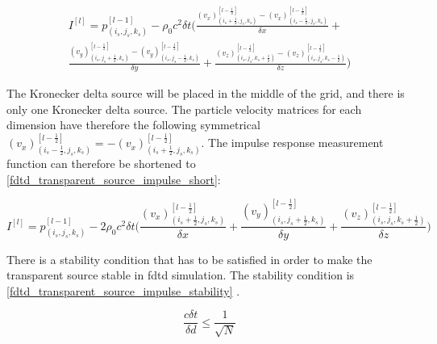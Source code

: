 \begin{multline}\label{fdtd_transparent_source_impulse}
I^{[l]}=p_{(i_{s},j_{s},k_{s})}^{[l-1]} - \rho_0 c^2 \delta t  \Biggl( \frac{(v_x)_{(i_{s}+\frac{1}{2},j_{s},k_{s})}^{[l-\frac{1}{2}]} - (v_x)_{(i_{s}-\frac{1}{2},j_{s},k_{s})}^{[l-\frac{1}{2}]}}{\delta x} +\\
 \frac{(v_y)_{(i_{s},j_{s}+\frac{1}{2},k_{s})}^{[l-\frac{1}{2}]}-(v_y)_{(i_{s},j_{s}-\frac{1}{2},k_{s})}^{[l-\frac{1}{2}]}}{\delta y} +  
 \frac{(v_z)_{(i_{s},j_{s},k_{s}+\frac{1}{2})}^{[l-\frac{1}{2}]}-(v_z)_{(i_{s},j_{s},k_{s}-\frac{1}{2})}^{[l-\frac{1}{2}]}}{\delta z} \Biggr)
\end{multline}


The Kronecker delta source will be placed in the middle of the grid, and there is only one Kronecker delta source. The particle velocity matrices for each dimension have therefore the following symmetrical $(v_x)_{(i_{s}-\frac{1}{2},j_{s},k_{s})}^{[l-\frac{1}{2}]} = -(v_x)_{(i_{s}+\frac{1}{2},j_{s},k_{s})}^{[l-\frac{1}{2}]}$. The impulse response measurement function can therefore be shortened to \autoref{fdtd_transparent_source_impulse_short}:

\begin{equation}\label{fdtd_transparent_source_impulse_short}
I^{[l]}=p_{(i_{s},j_{s},k_{s})}^{[l-1]} - 2\rho_0 c^2 \delta t  \Biggl( \frac{(v_x)_{(i_{s}+\frac{1}{2},j_{s},k_{s})}^{[l-\frac{1}{2}]}}{\delta x} +
 \frac{(v_y)_{(i_{s},j_{s}+\frac{1}{2},k_{s})}^{[l-\frac{1}{2}]}}{\delta y} +  
 \frac{(v_z)_{(i_{s},j_{s},k_{s}+\frac{1}{2})}^{[l-\frac{1}{2}]}}{\delta z} \Biggr)
\end{equation}

There is a stability condition that has to be satisfied in order to make the transparent source  stable in \gls{fdtd} simulation. The stability condition is \autoref{fdtd_transparent_source_impulse_stability} \citep{FDTDtransparent}. 


\begin{equation}\label{fdtd_transparent_source_impulse_stability}
\frac{c \delta t}{\delta d} \leq \frac{1}{\sqrt{N}}
\end{equation}

        \startexplain
    \stopexplain
    
    
